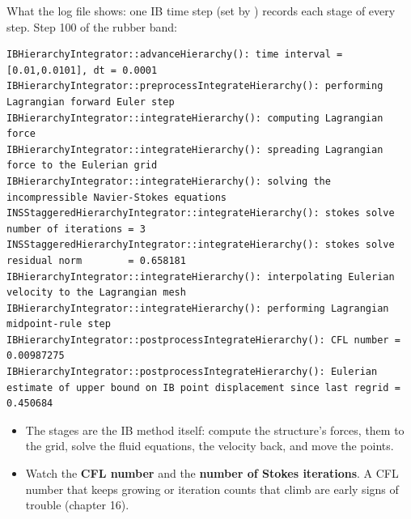 \documentclass[aspectratio=169,11pt]{beamer}
\begin{document}
\begin{frame}[fragile]{What the log file shows: one IB time step}
 (set by ) records each stage of every step. Step 100 of the rubber band:
\begin{lstlisting}[style=tiny]
IBHierarchyIntegrator::advanceHierarchy(): time interval = [0.01,0.0101], dt = 0.0001
IBHierarchyIntegrator::preprocessIntegrateHierarchy(): performing Lagrangian forward Euler step
IBHierarchyIntegrator::integrateHierarchy(): computing Lagrangian force
IBHierarchyIntegrator::integrateHierarchy(): spreading Lagrangian force to the Eulerian grid
IBHierarchyIntegrator::integrateHierarchy(): solving the incompressible Navier-Stokes equations
INSStaggeredHierarchyIntegrator::integrateHierarchy(): stokes solve number of iterations = 3
INSStaggeredHierarchyIntegrator::integrateHierarchy(): stokes solve residual norm        = 0.658181
IBHierarchyIntegrator::integrateHierarchy(): interpolating Eulerian velocity to the Lagrangian mesh
IBHierarchyIntegrator::integrateHierarchy(): performing Lagrangian midpoint-rule step
IBHierarchyIntegrator::postprocessIntegrateHierarchy(): CFL number = 0.00987275
IBHierarchyIntegrator::postprocessIntegrateHierarchy(): Eulerian estimate of upper bound on IB point displacement since last regrid = 0.450684
\end{lstlisting}
\begin{itemize}\small
  \item The stages are the IB method itself: compute the structure's forces,  them to the grid, solve the fluid equations,  the velocity back, and move the points.
  \item Watch the \textbf{CFL number} and the \textbf{number of Stokes iterations}. A CFL number that keeps growing or iteration counts that climb are early signs of trouble (chapter 16).
\end{itemize}
\end{frame}
\end{document}
